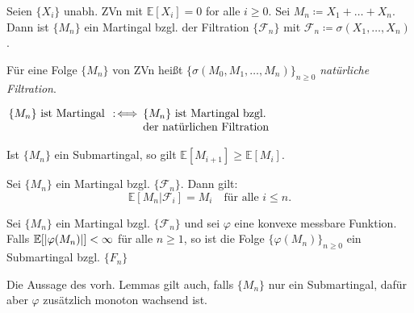 \documentclass{cheat-sheet}
\newcommand{\E}{\mathbb{E}} %
\newcommand{\Filt}{\mathcal{F}} %
\begin{document}
\begin{bsp}
  Seien $\{ X_i \}$ unabh. ZVn mit $\E[X_i] = 0$ for alle $i \geq 0$.
  Sei $M_n \coloneqq X_1 + \ldots + X_n$.
  Dann ist $\{ M_n \}$ ein Martingal bzgl. der Filtration $\{ \Filt_n \}$ mit $\Filt_n \coloneqq \sigma(X_1, \ldots, X_n)$.
\end{bsp}

\begin{defn}
  Für eine Folge $\{ M_n \}$ von ZVn heißt $\{ \sigma(M_0, M_1, \ldots, M_n) \}_{n \geq 0}$ \emph{natürliche Filtration}.
\end{defn}


\begin{defn}
  $
    \arraycolsep=1pt
    \begin{array}[t]{r c l}
      \{ M_n \} \text{ ist Martingal} & \coloniff & \{ M_n \} \text{ ist Martingal bzgl.} \\
      && \text{der natürlichen Filtration}
    \end{array}
  $
\end{defn}

\begin{lem}
  Ist $\{ M_n \}$ ein Submartingal, so gilt $\E[ M_{i+1} ] \geq \E[M_i]$.
\end{lem}

\begin{lem}
  Sei $\{ M_n \}$ ein Martingal bzgl. $\{ \Filt_n \}$.
  Dann gilt:
  \[
    \E[M_n | \Filt_i] = M_i
    \quad \text{für alle $i \leq n$.}
  \]
\end{lem}

\begin{lem}
  Sei $\{ M_n \}$ ein Martingal bzgl. $\{ \Filt_n \}$ und sei $\varphi$ eine konvexe messbare Funktion.
  Falls $\E [\abs{\varphi(M_n)}] < \infty$ für alle $n \geq 1$, so ist die Folge $\{ \varphi(M_n) \}_{n \geq 0}$ ein Submartingal bzgl. $\{ F_n \}$
\end{lem}

\begin{bem}
  Die Aussage des vorh. Lemmas gilt auch, falls $\{ M_n \}$ nur ein Submartingal, dafür aber $\varphi$ zusätzlich monoton wachsend ist.
\end{bem}
\end{document}
